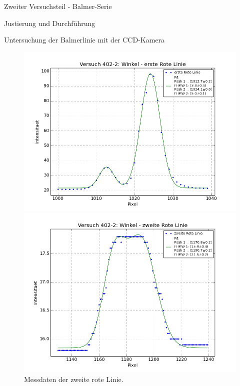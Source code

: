 \documentclass[pdftex, a4paper,11pt, twoside, ngerman]{report}
\begin{document}
\begin{chapter}{Zweiter Versuchsteil - Balmer-Serie}
\begin{section}{Justierung und Durchführung}
\begin{subsection}{Untersuchung der Balmerlinie mit der CCD-Kamera}
      \begin{figure}[ht!]
        \centering
        \begin{minipage}{0.48\textwidth}
          \centering
          \includegraphics[width=\textwidth]
              {Figures/Versuch402_2_ersteRoteLinie.png}
          \caption{Messdaten der erste rote Linie.}
          \label{fig:Versuch402_2_ersteRoteLinie}
        \end{minipage}\quad
        \begin{minipage}{0.48\textwidth}
          \centering
          \includegraphics[width=\textwidth]
              {Figures/Versuch402_2_zweiteRoteLinie.png}
          \caption{Messdaten der zweite rote Linie.}
          \label{fig:Versuch402_2_zweiteRoteLinie}

\end{minipage}
\end{figure}
\end{subsection}
\end{section}
\end{chapter}
\end{document}
